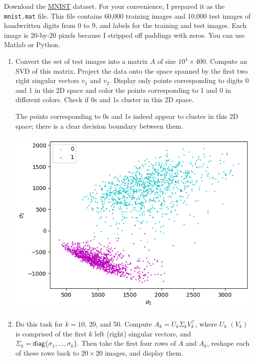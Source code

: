 \documentclass{../../../kin_math}
\begin{document}
\begin{questions}
  \question Download the \href{https://en.wikipedia.org/wiki/MNIST_database}{MNIST} dataset. For your convenience, I prepared it as the \texttt{mnist.mat} file. This file contains 60,000 training images and 10,000 test images of handwritten digits from 0 to 9, and labels for the training and test images. Each image is 20-by-20 pixels because I stripped off paddings with zeros. You can use Matlab or Python.
  \begin{enumerate}
    \item Convert the set of test images into a matrix $A$ of size $10^4 \times 400$. Compute an SVD of this matrix. Project the data onto the space spanned by the first two right singular vectors $v_1$ and $v_2$. Display only points corresponding to digits 0 and 1 in this 2D space and color the points corresponding to 1 and 0 in different colors. Check if 0s and 1s cluster in this 2D space.
    \begin{solution}
      The points corresponding to 0s and 1s indeed appear to cluster in this 2D space; there is a clear decision boundary between them.
      \begin{center}
        \includegraphics[scale=0.7]{mnist1.png}
      \end{center}
    \end{solution}
    \item Do this task for $k = 10$, 20, and 50. Compute $A_k = U_k \Sigma_k V_k^\top$, where $U_k$ $(V_k)$ is comprised of the first $k$ left (right) singular vectors, and $\Sigma_k = \textsf{diag}\{\sigma_1, \dots, \sigma_k\}$. Then take the first four rows of $A$ and $A_k$, reshape each of these rows back to $20 \times 20$ images, and display them.

\end{enumerate}
\end{questions}
\end{document}
